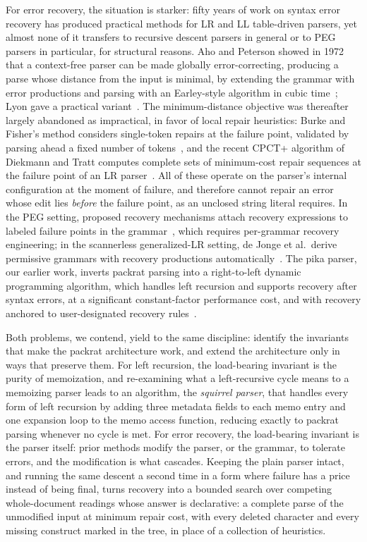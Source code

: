 \documentclass[manuscript]{acmart}
\begin{document}
For error recovery, the situation is starker: fifty years of work on syntax error recovery has produced practical methods for LR and LL table-driven parsers, yet almost none of it transfers to recursive descent parsers in general or to PEG parsers in particular, for structural reasons. Aho and Peterson showed in 1972 that a context-free parser can be made globally error-correcting, producing a parse whose distance from the input is minimal, by extending the grammar with error productions and parsing with an Earley-style algorithm in cubic time~\cite{aho1972}; Lyon gave a practical variant~\cite{lyon1974}. The minimum-distance objective was thereafter largely abandoned as impractical, in favor of local repair heuristics: Burke and Fisher's method considers single-token repairs at the failure point, validated by parsing ahead a fixed number of tokens~\cite{burke1987}, and the recent CPCT+ algorithm of Diekmann and Tratt computes complete sets of minimum-cost repair sequences at the failure point of an LR parser~\cite{diekmann2020}. All of these operate on the parser's internal configuration at the moment of failure, and therefore cannot repair an error whose edit lies \emph{before} the failure point, as an unclosed string literal requires. In the PEG setting, proposed recovery mechanisms attach recovery expressions to labeled failure points in the grammar~\cite{medeiros2018,medeiros2020}, which requires per-grammar recovery engineering; in the scannerless generalized-LR setting, de Jonge et al.\ derive permissive grammars with recovery productions automatically~\cite{dejonge2012}. The pika parser, our earlier work, inverts packrat parsing into a right-to-left dynamic programming algorithm, which handles left recursion and supports recovery after syntax errors, at a significant constant-factor performance cost, and with recovery anchored to user-designated recovery rules~\cite{hutchison2020}.

Both problems, we contend, yield to the same discipline: identify the invariants that make the packrat architecture work, and extend the architecture only in ways that preserve them. For left recursion, the load-bearing invariant is the purity of memoization, and re-examining what a left-recursive cycle means to a memoizing parser leads to an algorithm, the \emph{squirrel parser}, that handles every form of left recursion by adding three metadata fields to each memo entry and one expansion loop to the memo access function, reducing exactly to packrat parsing whenever no cycle is met. For error recovery, the load-bearing invariant is the parser itself: prior methods modify the parser, or the grammar, to tolerate errors, and the modification is what cascades. Keeping the plain parser intact, and running the same descent a second time in a form where failure has a price instead of being final, turns recovery into a bounded search over competing whole-document readings whose answer is declarative: a complete parse of the unmodified input at minimum repair cost, with every deleted character and every missing construct marked in the tree, in place of a collection of heuristics.
\end{document}
